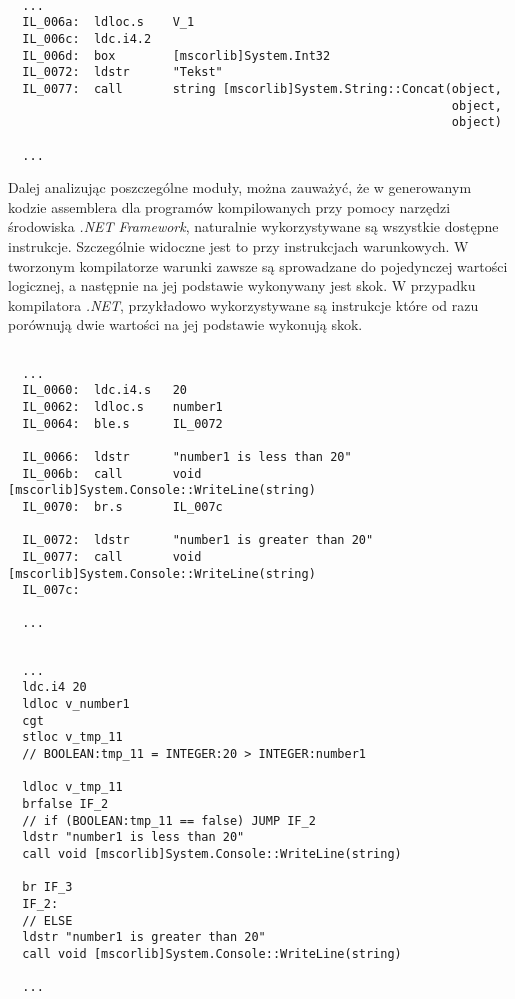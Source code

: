 \begin{lstlisting}[language=IL, caption={Fragment kodu deasemblerowanego testu programu C\#, przedstawiający łączenie łańcuchów znaków}, label=alg:asm]

  ...
  IL_006a:  ldloc.s    V_1
  IL_006c:  ldc.i4.2
  IL_006d:  box        [mscorlib]System.Int32
  IL_0072:  ldstr      "Tekst"
  IL_0077:  call       string [mscorlib]System.String::Concat(object,
                                                              object,
                                                              object)

  ...
\end{lstlisting}

\par Dalej analizując poszczególne moduły, można zauważyć, że w generowanym kodzie assemblera dla programów kompilowanych przy pomocy narzędzi środowiska \textit{.NET Framework}, naturalnie wykorzystywane są wszystkie dostępne instrukcje. Szczególnie widoczne jest to przy instrukcjach warunkowych. W tworzonym kompilatorze warunki zawsze są sprowadzane do pojedynczej wartości logicznej, a następnie na jej podstawie wykonywany jest skok. W przypadku kompilatora \textit{.NET}, przykładowo wykorzystywane są instrukcje które od razu porównują dwie wartości na jej podstawie wykonują skok.

\begin{lstlisting}[language=IL, caption={Fragment kodu deasemblerowanego testu programu C\#, przedstawiający instrukcje \texttt{if ... else}}, label=alg:asm]

  ...
  IL_0060:  ldc.i4.s   20
  IL_0062:  ldloc.s    number1
  IL_0064:  ble.s      IL_0072

  IL_0066:  ldstr      "number1 is less than 20"
  IL_006b:  call       void [mscorlib]System.Console::WriteLine(string)
  IL_0070:  br.s       IL_007c

  IL_0072:  ldstr      "number1 is greater than 20"
  IL_0077:  call       void [mscorlib]System.Console::WriteLine(string)
  IL_007c:  

  ...
\end{lstlisting}

\begin{lstlisting}[language=IL, caption={Fragment wygenerowanego kodu asemblerowanego z języka JavaScript, przedstawiający instrukcje \texttt{if ... else}}, label=alg:asm]

  ...
  ldc.i4 20
  ldloc v_number1
  cgt
  stloc v_tmp_11
  // BOOLEAN:tmp_11 = INTEGER:20 > INTEGER:number1
  
  ldloc v_tmp_11
  brfalse IF_2
  // if (BOOLEAN:tmp_11 == false) JUMP IF_2
  ldstr "number1 is less than 20"
  call void [mscorlib]System.Console::WriteLine(string)
  
  br IF_3
  IF_2: 
  // ELSE
  ldstr "number1 is greater than 20"
  call void [mscorlib]System.Console::WriteLine(string)

  ...
\end{lstlisting}

